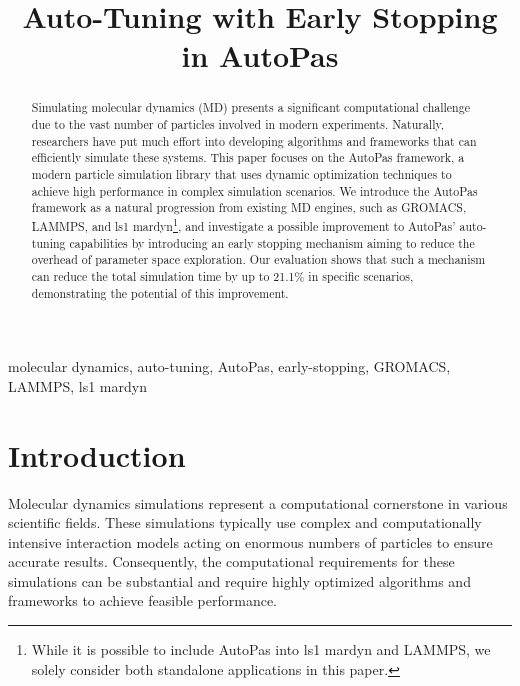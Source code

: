\documentclass[conference]{IEEEtran}
\begin{document}
\title{Auto-Tuning with Early Stopping in AutoPas}

\author{
}

\maketitle

\begin{abstract}
    Simulating molecular dynamics (MD) presents a significant computational challenge due to the vast number of particles involved in modern experiments. Naturally, researchers have put much effort into developing algorithms and frameworks that can efficiently simulate these systems. This paper focuses on the AutoPas framework, a modern particle simulation library that uses dynamic optimization techniques to achieve high performance in complex simulation scenarios. We introduce the AutoPas framework as a natural progression from existing MD engines, such as GROMACS, LAMMPS, and ls1 mardyn\footnote{
        While it is possible to include AutoPas into ls1 mardyn and LAMMPS, we solely consider both standalone applications in this paper.
    }, and investigate a possible improvement to AutoPas' auto-tuning capabilities by introducing an early stopping mechanism aiming to reduce the overhead of parameter space exploration. Our evaluation shows that such a mechanism can reduce the total simulation time by up to 21.1\% in specific scenarios, demonstrating the potential of this improvement.
\end{abstract}

\begin{IEEEkeywords}
    molecular dynamics, auto-tuning, AutoPas, early-stopping, GROMACS, LAMMPS, ls1 mardyn
\end{IEEEkeywords}

\section{Introduction}

Molecular dynamics simulations represent a computational cornerstone in various scientific fields. These simulations typically use complex and computationally intensive interaction models acting on enormous numbers of particles to ensure accurate results. Consequently, the computational requirements for these simulations can be substantial and require highly optimized algorithms and frameworks to achieve feasible performance.
\end{document}
